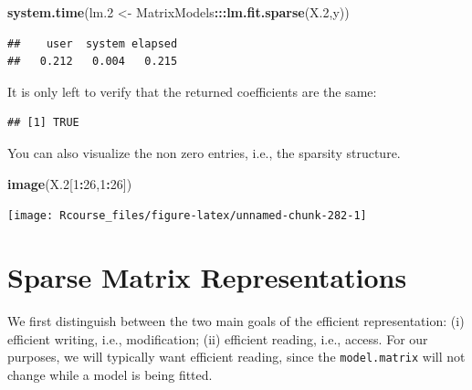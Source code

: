 \documentclass[]{book}
\newenvironment{Shaded}{\begin{snugshade}}{\end{snugshade}}
\newcommand{\KeywordTok}[1]{\textcolor[rgb]{0.13,0.29,0.53}{\textbf{#1}}}
\newcommand{\DataTypeTok}[1]{\textcolor[rgb]{0.13,0.29,0.53}{#1}}
\newcommand{\DecValTok}[1]{\textcolor[rgb]{0.00,0.00,0.81}{#1}}
\newcommand{\FloatTok}[1]{\textcolor[rgb]{0.00,0.00,0.81}{#1}}
\newcommand{\StringTok}[1]{\textcolor[rgb]{0.31,0.60,0.02}{#1}}
\newcommand{\OperatorTok}[1]{\textcolor[rgb]{0.81,0.36,0.00}{\textbf{#1}}}
\newcommand{\NormalTok}[1]{#1}
\theoremstyle{definition}
\theoremstyle{definition}
\theoremstyle{definition}
\theoremstyle{remark}
\begin{document}
\begin{Shaded}
\begin{Highlighting}[]
\KeywordTok{system.time}\NormalTok{(lm.}\DecValTok{2}\NormalTok{ <-}\StringTok{ }\NormalTok{MatrixModels}\OperatorTok{:::}\KeywordTok{lm.fit.sparse}\NormalTok{(X.}\DecValTok{2}\NormalTok{,y))}
\end{Highlighting}
\end{Shaded}

\begin{verbatim}
##    user  system elapsed 
##   0.212   0.004   0.215
\end{verbatim}

It is only left to verify that the returned coefficients are the same:

\begin{Shaded}
\end{Shaded}

\begin{verbatim}
## [1] TRUE
\end{verbatim}

You can also visualize the non zero entries, i.e., the sparsity
structure.

\begin{Shaded}
\begin{Highlighting}[]
\KeywordTok{image}\NormalTok{(X.}\DecValTok{2}\NormalTok{[}\DecValTok{1}\OperatorTok{:}\DecValTok{26}\NormalTok{,}\DecValTok{1}\OperatorTok{:}\DecValTok{26}\NormalTok{])}
\end{Highlighting}
\end{Shaded}

\texttt{[image: Rcourse\_files/figure-latex/unnamed-chunk-282-1]}

\section{Sparse Matrix
Representations}\label{sparse-matrix-representations}

We first distinguish between the two main goals of the efficient
representation: (i) efficient writing, i.e., modification; (ii)
efficient reading, i.e., access. For our purposes, we will typically
want efficient reading, since the \texttt{model.matrix} will not change
while a model is being fitted.
\end{document}
